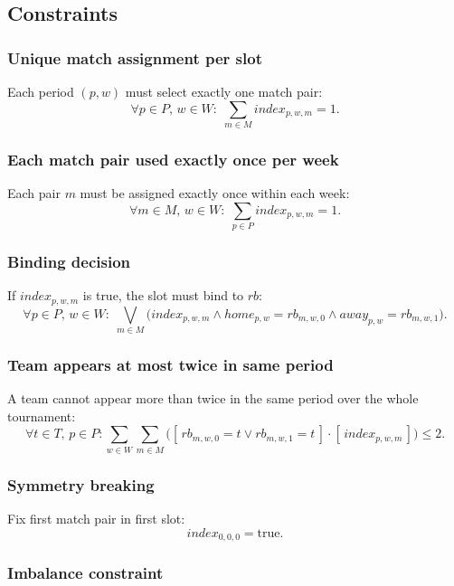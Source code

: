 \subsection{Constraints}

\subsubsection{Unique match assignment per slot}

Each period $(p,w)$ must select exactly one match pair:
\[
\forall p \in P,\, w \in W:\; 
\sum_{m \in M} \mathit{index}_{p,w,m} = 1.
\]

\subsubsection{Each match pair used exactly once per week}

Each pair $m$ must be assigned exactly once within each week:
\[
\forall m \in M,\, w \in W:\; 
\sum_{p \in P} \mathit{index}_{p,w,m} = 1.
\]

\subsubsection{Binding decision}

If $\mathit{index}_{p,w,m}$ is true, the slot must bind to $rb$:
\[
\forall p \in P,\, w \in W:\; 
\bigvee_{m \in M} \Big(
  \mathit{index}_{p,w,m} \wedge 
  \mathit{home}_{p,w} = rb_{m,w,0} \wedge 
  \mathit{away}_{p,w} = rb_{m,w,1}
\Big).
\]

\subsubsection{Team appears at most twice in same period}

A team cannot appear more than twice in the same period over the whole tournament:
\[
\forall t \in T,\, p \in P: 
\sum_{w \in W} 
\sum_{m \in M} \Big(
  [\, rb_{m,w,0} = t \vee rb_{m,w,1} = t\, ] \cdot [\, \mathit{index}_{p,w,m} \, ]
\Big) 
\leq 2.
\]

\subsubsection{Symmetry breaking}

Fix first match pair in first slot:
\[
\mathit{index}_{0,0,0} = \text{true}.
\]

\subsubsection{Imbalance constraint}

